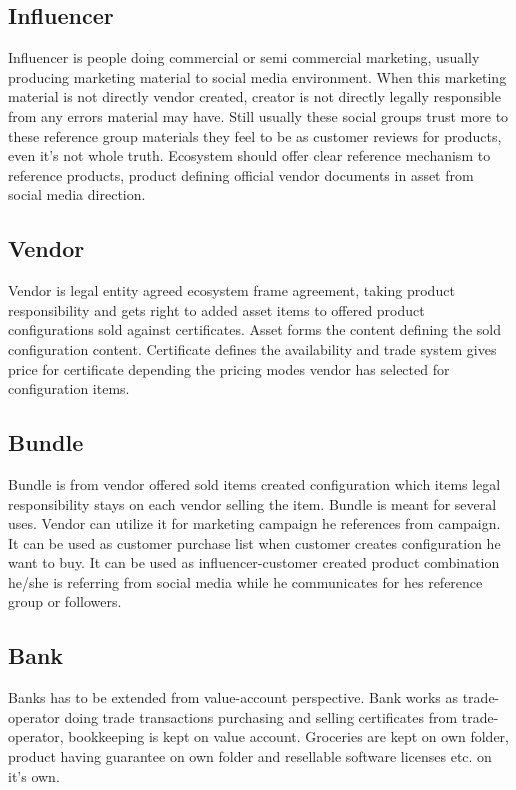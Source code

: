 \subsection{Influencer}
\label{influencer}
Influencer is people doing commercial or semi commercial marketing, usually producing marketing material to social media environment. When this marketing material is not directly vendor created, creator is not directly legally responsible from any errors material may have. Still usually these social groups trust more to these reference group materials they feel to be as customer reviews for products, even it's not whole truth. Ecosystem should offer clear reference mechanism to reference products, product defining official vendor documents in asset from social media direction.

\subsection{Vendor}
\label{vendor}
Vendor is legal entity agreed ecosystem frame agreement, taking product responsibility and gets right to added asset items to offered product configurations sold against certificates. Asset forms the content defining the sold configuration content. Certificate defines the availability and trade system gives price for certificate depending the pricing modes vendor has selected for configuration items.

\subsection{Bundle}
\label{bundle}
Bundle is from vendor offered sold items created configuration which items legal responsibility stays on each vendor selling the item. Bundle is meant for several uses. Vendor can utilize it for marketing campaign he references from campaign. It can be used as customer purchase list when customer creates configuration he want to buy. It can be used as influencer-customer created product combination he/she is referring from social media while he communicates for hes reference group or followers.

\subsection{Bank}
\label{bank}
Banks has to be extended from value-account perspective. Bank works as trade-operator doing trade transactions purchasing and selling certificates from trade-operator, bookkeeping is kept on value account. Groceries are kept on own folder, product having guarantee on own folder and resellable software licenses etc. on it's own.

